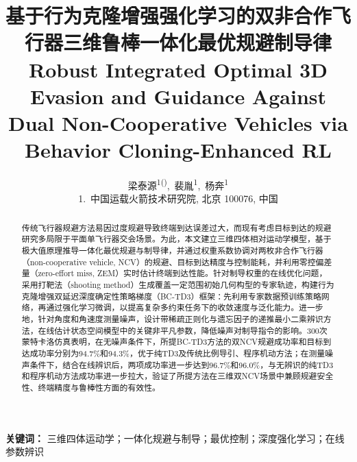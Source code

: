 

\title{基于行为克隆增强强化学习的双非合作飞行器三维鲁棒一体化最优规避制导律\\[0.6em]
{\large Robust Integrated Optimal 3D Evasion and Guidance Against Dual Non-Cooperative Vehicles via Behavior Cloning-Enhanced RL}}
\author{%
梁泰源\textsuperscript{1()},~裴胤\textsuperscript{1},~杨奔\textsuperscript{1}\\[0.6em]
{\normalsize 1.~中国运载火箭技术研究院, 北京 100076, 中国}%
}
\date{}


\maketitle

\begin{abstract}
传统飞行器规避方法易因过度规避导致终端到达误差过大，而现有考虑目标到达的规避研究多局限于平面单飞行器交会场景。为此，本文建立三维四体相对运动学模型，基于极大值原理推导一体化最优规避与制导律，并通过权重系数协调对两枚非合作飞行器（non-cooperative vehicle, NCV）的规避、目标到达精度与控制能耗，并利用零控偏差量（zero-effort miss, ZEM）实时估计终端到达性能。针对制导权重的在线优化问题，采用打靶法（shooting method）生成覆盖一定范围初始几何构型的专家轨迹，构建行为克隆增强双延迟深度确定性策略梯度（BC-TD3）框架：先利用专家数据预训练策略网络，再通过强化学习微调，以提高复杂多约束任务下的收敛速度与泛化能力。进一步地，针对角度和角速度测量噪声，设计带稀疏正则化与遗忘因子的递推最小二乘辨识方法，在线估计状态空间模型中的关键非平凡参数，降低噪声对制导指令的影响。300次蒙特卡洛仿真表明，在无噪声条件下，所提BC-TD3方法的双NCV规避成功率和目标到达成功率分别为94.7\%和94.3\%，优于纯TD3及传统比例导引、程序机动方法；在测量噪声条件下，结合在线辨识后，两项成功率进一步达到96.7\%和96.0\%，与无辨识的纯TD3和程序机动方法成功率进一步拉大，验证了所提方法在三维双NCV场景中兼顾规避安全性、终端精度与鲁棒性方面的有效性。
\end{abstract}

\noindent\textbf{关键词：} 三维四体运动学；一体化规避与制导；最优控制；深度强化学习；在线参数辨识









\printbibliography[title={参考文献}]

